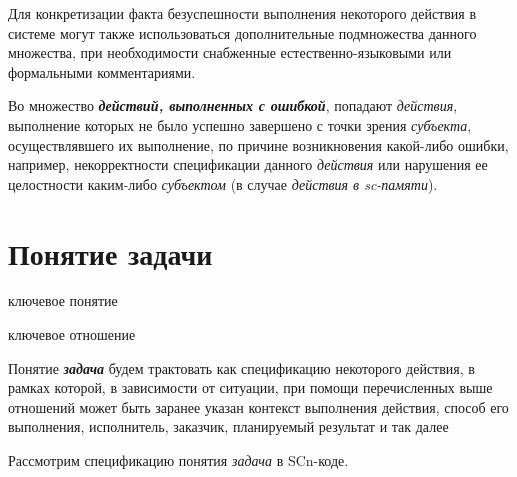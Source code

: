Для конкретизации факта безуспешности выполнения некоторого действия в системе могут также использоваться дополнительные подмножества данного множества, при необходимости снабженные естественно-языковыми или формальными комментариями.

Во множество \textbf{\textit{действий, выполненных с ошибкой}}, попадают \textit{действия}, выполнение которых не было успешно завершено с точки зрения \textit{субъекта}, осуществлявшего их выполнение, по причине возникновения какой-либо ошибки, например, некорректности спецификации данного \textit{действия} или нарушения ее целостности каким-либо \textit{субъектом} (в случае \textit{действия в sc-памяти}).


\section{Понятие задачи}
\label{sec_problem_concept}

\begin{SCn}
	\begin{scnrelfromlist}{ключевое понятие}
	\end{scnrelfromlist}

	\begin{scnrelfromlist}{ключевое отношение}
	\end{scnrelfromlist}
\end{SCn}

Понятие \textbf{\textit{задача}} будем трактовать как спецификацию некоторого действия, в рамках которой, в зависимости от ситуации, при помощи перечисленных выше отношений может быть заранее указан контекст выполнения действия, способ его выполнения, исполнитель, заказчик, планируемый результат и так далее

Рассмотрим спецификацию понятия \textit{задача} в SCn-коде.

\begin{SCn}
\end{SCn}


